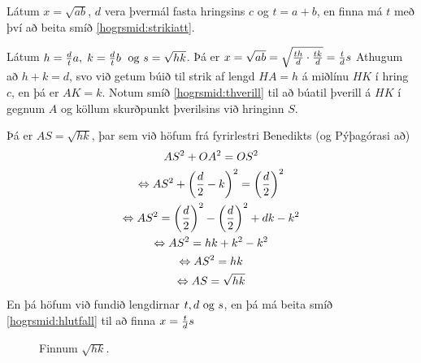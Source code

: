 \begin{frame}[allowframebreaks]
  \begin{hogrsmid}\label{hogrsmid:kvadratrot}
    Látum \(x = \sqrt{ab}\), \(d\) vera þvermál fasta hringsins \(c\) og \(t = a+b\),
    en finna má \(t\) með því að beita smíð \ref{hogrsmid:strikiatt}.

    Látum \(h =\frac{d}{t}a, \; k = \frac{d}{t}b \; \text{ og } s = \sqrt{hk}\).
    Þá er \(x = \sqrt{ab} = \sqrt{\frac{th}{d} \cdot \frac{tk}{d}} = \frac{t}{d}s\)
    Athugum að \(h+k = d\), svo við getum búið til strik af lengd
    \(HA = h\) á miðlínu \(HK\) í hring \(c\), en þá er \(AK = k\).
    Notum smíð \ref{hogrsmid:thverill} til að búatil þverill á \(HK\) í
    gegnum \(A\) og köllum skurðpunkt þverilsins við hringinn \(S\).
    
    \theorembreak
    Þá er \(AS = \sqrt{hk}\), þar sem við höfum frá fyrirlestri Benedikts
    (og Pýþagórasi að)
    \begin{gather*}
      AS^2 + OA^2 = OS^2\\
      \Leftrightarrow AS^2 + \left(\frac{d}{2} - k \right)^2 = \left(\frac{d}{2} \right)^2\\
    \Leftrightarrow AS^2 = \left( \frac{d}{2} \right)^2 - \left( \frac{d}{2} \right)^2 + dk - k^2 \\
    \Leftrightarrow AS^2 = hk + k^2 - k^2\\
    \Leftrightarrow AS^2 = hk\\
    \Leftrightarrow AS = \sqrt{hk}
  \end{gather*}
  En þá höfum við fundið lengdirnar \(t, d \text{ og } s\), en þá má beita
  smíð \ref{hogrsmid:hlutfall} til að finna \(x = \frac{t}{d}s\)
  \end{hogrsmid}
\end{frame}

\begin{frame}
  \begin{figure}[H]
    \centering

    \caption{Finnum \(\sqrt{hk}\).}
    \label{fig:kvadratrot}
  \end{figure}
\end{frame}

